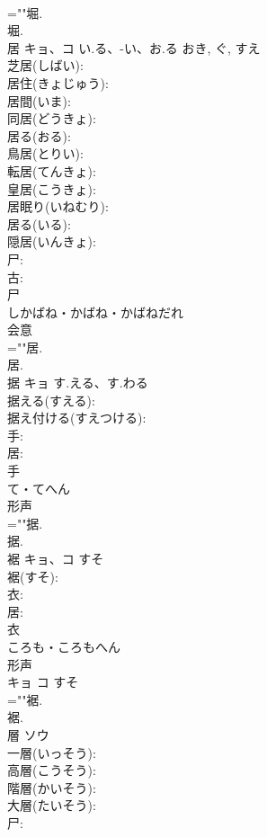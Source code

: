 \documentclass[8pt]{extreport}
\begin{document}
\begin{CJK}{UTF8}{min}
\\	=""堀.
\\	堀.
\\	居	キョ、コ	い.る、-い、お.る	おき, ぐ, すえ	
\\	芝居(しばい): 
\\	居住(きょじゅう): 
\\	居間(いま): 
\\	同居(どうきょ): 
\\	居る(おる): 
\\	鳥居(とりい): 
\\	転居(てんきょ): 
\\	皇居(こうきょ): 
\\	居眠り(いねむり): 
\\	居る(いる): 
\\	隠居(いんきょ): 
\\	尸: 
\\	古: 
\\	尸	
\\	しかばね・かばね・かばねだれ	
\\	会意 
\\	=""居.
\\	居.
\\	据	キョ	す.える、す.わる		
\\	据える(すえる): 
\\	据え付ける(すえつける): 
\\	手: 
\\	居: 
\\	手	
\\	て・てへん	
\\	形声 
\\	=""据.
\\	据.
\\	裾	キョ、コ	すそ		
\\	裾(すそ): 
\\	衣: 
\\	居: 
\\	衣	
\\	ころも・ころもへん	
\\	形声 
\\	キョ コ すそ 
\\	=""裾.
\\	裾.
\\	層	ソウ			
\\	一層(いっそう): 
\\	高層(こうそう): 
\\	階層(かいそう): 
\\	大層(たいそう): 
\\	尸: 

\end{CJK}
\end{document}
